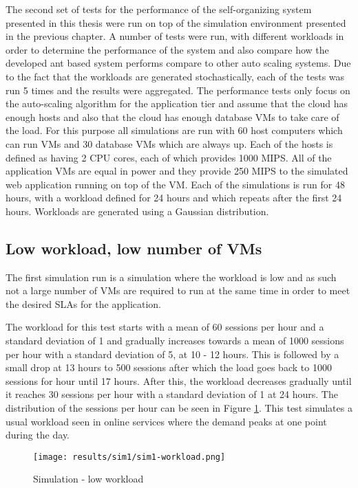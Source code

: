 The second set of tests for the performance of the self-organizing system presented in this thesis were run on top of the simulation environment presented in the previous chapter. A number of tests were run, with different workloads in order to determine the performance of the system and also compare how the developed ant based system performs compare to other auto scaling systems. Due to the fact that the workloads are generated stochastically, each of the tests was run 5 times and the results were aggregated. The performance tests only focus on the auto-scaling algorithm for the application tier and assume that the cloud has enough hosts and also that the cloud has enough database VMs to take care of the load. For this purpose all simulations are run with 60 host computers which can run VMs and 30 database VMs which are always up. Each of the hosts is defined as having 2 CPU cores, each of which provides 1000 MIPS. All of the application VMs are equal in power and they provide 250 MIPS to the simulated web application running on top of the VM. Each of the simulations is run for 48 hours, with a workload defined for 24 hours and which repeats after the first 24 hours. Workloads are generated using a Gaussian distribution.

\subsection{Low workload, low number of VMs}

The first simulation run is a simulation where the workload is low and as such not a large number of VMs are required to run at the same time in order to meet the desired SLAs for the application.

The workload for this test starts with a mean of 60 sessions per hour and a standard deviation of 1 and gradually increases towards a mean of 1000 sessions per hour with a standard deviation of 5, at 10 - 12 hours. This is followed by a small drop at 13 hours to 500 sessions after which the load goes back to 1000 sessions for hour until 17 hours. After this, the workload decreases gradually until it reaches 30 sessions per hour with a standard deviation of 1 at 24 hours. The distribution of the sessions per hour can be seen in Figure \ref{fig:sim1-workload}. This test simulates a usual workload seen in online services where the demand peaks at one point during the day.

\begin{figure}
	\centering
		\texttt{[image: results/sim1/sim1-workload.png]}
	\caption{Simulation - low workload}
	\label{fig:sim1-workload}
\end{figure}

